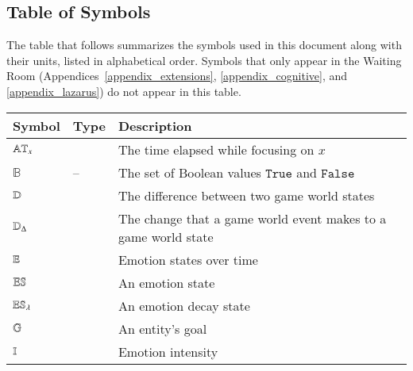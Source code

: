 \subsection{Table of Symbols}

The table that follows summarizes the symbols used in this document along with
their units, listed in alphabetical order. Symbols that only appear in the
Waiting Room (Appendices~\ref{appendix_extensions}, \ref{appendix_cognitive},
and \ref{appendix_lazarus}) do not appear in this table.

\noindent \begin{center}
    \renewcommand{\arraystretch}{1.2}
    \begin{longtable*}{C{0.1\textwidth} C{0.1\textwidth}
            m{0.7\textwidth}} \toprule
        \textbf{Symbol} & \textbf{Type} & \textbf{Description}\\
        \midrule

        $\mathbb{AT}_x$ &  & The time
        elapsed while focusing on $x$ \\

        $\mathbb{B}$ & -- & The set of Boolean values $\mathtt{True}$ and
        $\mathtt{False}$ \\

        $\mathbb{D}$ &
         & The difference between two game
        world states \\

        $\mathbb{D}_{\Delta}$ &
         & The change that a game
        world event makes to a game world state \\

        $\mathbb{E}$ &  & Emotion
        states over time \\

        $\mathbb{ES}$ &  & An emotion state \\

        $\mathbb{ES}_\lambda$ &
         & An emotion decay state \\

        $\mathbb{G}$ &  & An entity's goal \\

        $\mathbb{I}$ &
         & Emotion intensity \\


\end{longtable*}
\end{center}
